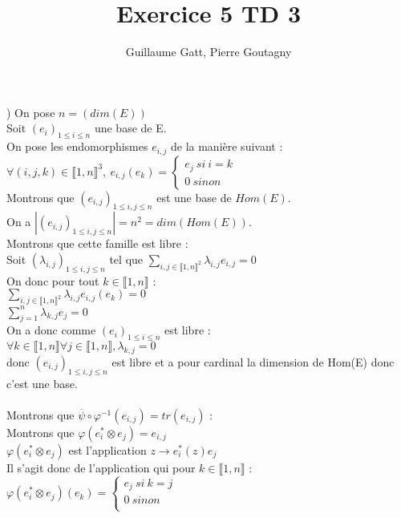 \documentclass{article}
\begin{document}
\title{Exercice 5 TD 3}
\author{Guillaume Gatt, Pierre Goutagny}
) On pose $n=(dim(E))$ \\
Soit $(e_i)_{ 1\leq i \leq n}$ une base de E. \\
On pose les endomorphismes $e_{i,j}$ de la manière suivant : \\
$\forall (i,j,k) \in \llbracket 1,n\rrbracket^3,\ e_{i,j}(e_k)=\begin{cases}
e_j \ si \ i=k \\
0 \ sinon
\end{cases}$ \\
Montrons que $(e_{i,j})_{ 1\leq i,j \leq n}$ est une base de $Hom(E)$. \\
On a $|(e_{i,j})_{ 1\leq i,j \leq n}|=n^2=dim(Hom(E))$. \\
Montrons que cette famille est libre : \\
Soit $(\lambda_{i,j})_{1 \leq i,j \leq n}$ tel que $\sum_{i,j \in \llbracket 1 , n \rrbracket^2} \lambda_{i,j} e_{i,j} =0$ \\
On donc pour tout $k \in \llbracket1,n\rrbracket$ : \\
$\sum_{i,j \in \llbracket 1 , n \rrbracket^2} \lambda_{i,j} e_{i,j}(e_k) =0$ \\
$\sum_{j=1}^{n} \lambda_{k,j} e_j =0$ \\
On a donc comme $(e_i)_{ 1\leq i \leq n}$ est libre : \\
$\forall k \in \llbracket1,n\rrbracket \forall j \in \llbracket 1,n \rrbracket, \lambda_{k,j}=0$ \\
donc $(e_{i,j})_{ 1\leq i,j \leq n}$ est libre et a pour cardinal la dimension de Hom(E) donc c'est une base. \\ \\
Montrons que $\overline{\psi} \circ \varphi^{-1}(e_{i,j})=tr(e_{i,j})$ : \\
Montrons que $\varphi(e^\ast_i \otimes e_{j})= e_{i,j}$ \\
$\varphi(e^\ast_i \otimes e_{j})$  est l'application $z \rightarrow e^*_i(z)e_j$ \\
Il s'agit donc de l'application qui pour $k\in \llbracket1,n\rrbracket$ : \\
$\varphi(e^\ast_i \otimes e_{j})(e_k)=\begin{cases}
e_j \ si \ k=j \\
0 \ sinon \\
\end{cases}$ \\
\end{document}
